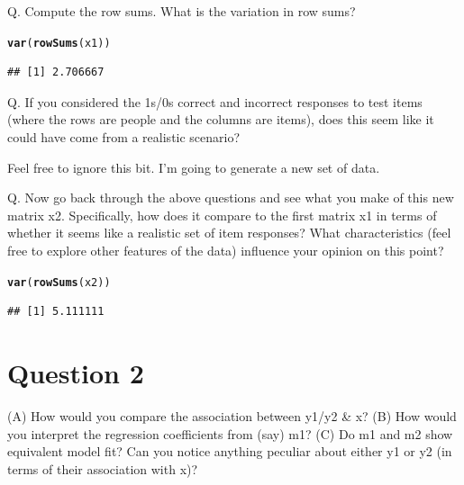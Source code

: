 \documentclass[letterpaper,12pt]{article}\usepackage[]{graphicx}\usepackage[]{color}
\makeatletter
\newcommand{\hlstd}[1]{\textcolor[rgb]{0.345,0.345,0.345}{#1}}%
\newcommand{\hlkwd}[1]{\textcolor[rgb]{0.737,0.353,0.396}{\textbf{#1}}}%
\newenvironment{kframe}{%
 \def\at@end@of@kframe{}%
 \ifinner\ifhmode%
  \def\at@end@of@kframe{\end{minipage}}%
  \begin{minipage}{\columnwidth}%
 \fi\fi%
 \def\FrameCommand##1{\hskip\@totalleftmargin \hskip-\fboxsep
 \colorbox{shadecolor}{##1}\hskip-\fboxsep
     \hskip-\linewidth \hskip-\@totalleftmargin \hskip\columnwidth}%
 \MakeFramed {\advance\hsize-\width
   \@totalleftmargin\z@ \linewidth\hsize
   \@setminipage}}%
 {\par\unskip\endMakeFramed%
 \at@end@of@kframe}
\newenvironment{knitrout}{}{} %
\numberwithin{equation}{section}
\makeatother
\begin{document}
Q. Compute the row sums. What is the variation in row sums?

\begin{knitrout}
\color{fgcolor}\begin{kframe}
\begin{alltt}
\hlkwd{var}\hlstd{(}\hlkwd{rowSums}\hlstd{(x1))}
\end{alltt}
\begin{verbatim}
## [1] 2.706667
\end{verbatim}
\end{kframe}
\end{knitrout}

Q. If you considered the 1s/0s correct and incorrect responses to test items (where the rows are people and the columns are items), does this seem like it could have come from a realistic scenario?

Feel free to ignore this bit. I'm going to generate a new set of data. 



Q. Now go back through the above questions and see what you make of this new matrix x2. Specifically, how does it compare to the first matrix x1 in terms of whether it seems like a realistic set of item responses? What characteristics (feel free to explore other features of the data) influence your opinion on this point?

\begin{knitrout}
\color{fgcolor}\begin{kframe}
\begin{alltt}
\hlkwd{var}\hlstd{(}\hlkwd{rowSums}\hlstd{(x2))}
\end{alltt}
\begin{verbatim}
## [1] 5.111111
\end{verbatim}
\end{kframe}
\end{knitrout}

\section{Question 2}

(A) How would you compare the association between y1/y2 \& x? (B) How would you interpret the regression coefficients from (say) m1? (C) Do m1 and m2 show equivalent model fit? Can you notice anything peculiar about either y1 or y2 (in terms of their association with x)?
\end{document}
